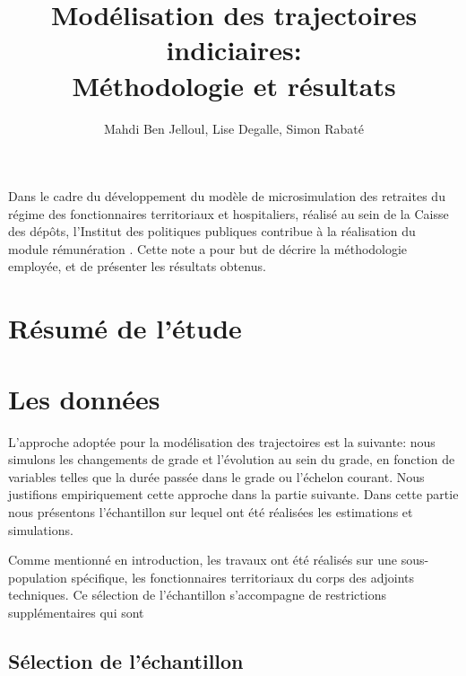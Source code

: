 \documentclass{article}
\title{Modélisation des trajectoires indiciaires: \\ Méthodologie et résultats}
\author{Mahdi Ben Jelloul, Lise Degalle, Simon Rabaté}
\begin{document}
\maketitle


Dans le cadre du développement du modèle de microsimulation des retraites du régime des fonctionnaires territoriaux et hospitaliers, réalisé au sein de la Caisse des dépôts, l'Institut des politiques publiques contribue à la réalisation du module \og rémunération \fg{}. Cette note a pour but de décrire la méthodologie employée, et de présenter les résultats obtenus. 


\tableofcontents


\clearpage

\section{Résumé de l'étude}


\section{Les données}

L'approche adoptée pour la modélisation des trajectoires est la suivante: nous simulons les changements de grade et l'évolution au sein du grade, en fonction de variables telles que la durée passée dans le grade ou l'échelon courant. Nous justifions empiriquement cette approche dans la partie suivante. Dans cette partie nous présentons l'échantillon sur lequel ont été réalisées les estimations et simulations. 

Comme mentionné en introduction, les travaux ont été réalisés sur une sous-population spécifique, les fonctionnaires territoriaux du corps des adjoints techniques. Ce sélection de l'échantillon s'accompagne de restrictions supplémentaires qui sont 


\subsection{Sélection de l'échantillon}
\end{document}

